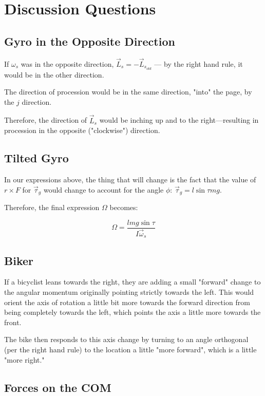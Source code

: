 \documentclass[letterpaper]{article}
\begin{document}
\section{Discussion Questions}
\label{sec:org8f27e8d}

\subsection{Gyro in the Opposite Direction}
\label{sec:org8f3fe89}
If \(\omega_s\) was in the opposite direction, \(\vec{L}_s = -\vec{L}_s_{old}\) --- by the right hand rule, it would be in the other direction.

The direction of procession would be in the same direction, "into" the page, by the \(\hat{j}\) direction.

Therefore, the direction of \(\vec{L}_s\) would be inching up and to the right---resulting in procession in the opposite ("clockwise") direction.

\subsection{Tilted Gyro}
\label{sec:org31ec2a5}
In our expressions above, the thing that will change is the fact that the value of \(r\times F\) for \(\vec{\tau}_g\) would change to account for the angle \(\phi\): \(\vec{\tau}_g = l\sin\tau mg\).

Therefore, the final expression \(\Omega\) becomes:

\begin{equation}
   \Omega = \frac{lmg\sin \tau}{I \vec{\omega}_s} 
\end{equation}

\subsection{Biker}
\label{sec:org0496d61}
If a bicyclist leans towards the right, they are adding a small "forward" change to the angular momentum originally pointing strictly towards the left. This would orient the axis of rotation a little bit more towards the forward direction from being completely towards the left, which points the axis a little more towards the front.

The bike then responds to this axis change by turning to an angle orthogonal (per the right hand rule) to the location a little "more forward", which is a little "more right."

\subsection{Forces on the COM}
\label{sec:orgc4bda77}
\end{document}
